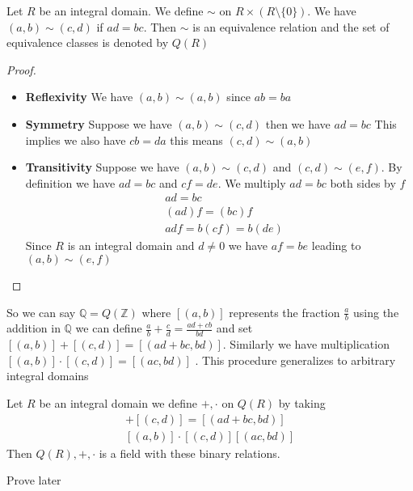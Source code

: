 \documentclass[16pt,a4paper]{article}
\theoremstyle{definition}
\newcommand{\Z}{\mathbb{Z}}
\begin{document}
\begin{prop}{}{}
Let $R$ be an integral domain. We define $\sim$ on $R\times (R\setminus \{0\})$. We have $(a,b) \sim (c,d)$ if $ad = bc$. Then $\sim$ is an equivalence relation and the set of equivalence classes is denoted by $Q(R)$
\end{prop}
\begin{proof}
$\quad$
\begin{itemize}
\item \textbf{Reflexivity} We have $(a,b) \sim (a,b)$ since $ab = ba$
\item \textbf{Symmetry} Suppose we have $(a,b)\sim (c,d)$ then we have $ad = bc$ This implies we also have $cb=da$ this means  $(c,d)\sim (a,b)$
\item \textbf{Transitivity} Suppose we have $(a,b)\sim (c,d)$ and $(c,d)\sim (e,f)$. By definition we have $ad = bc$ and $cf = de$. We multiply $ad = bc$ both sides by $f$
\begin{align*}
&ad = bc \\
&(ad)f = (bc)f \\
& adf = b(cf) = b(de)
\end{align*} 
Since $R$ is an integral domain and $d\neq 0$ we have $af = be$ leading to $(a,b) \sim (e,f)$
\end{itemize}
\end{proof}
So we can say $\mathbb{Q} = Q(\Z)$ where $[(a,b)]$ represents the fraction $\frac a b$ using the addition in $\mathbb{Q}$ we can define $\frac{a}{b} + \frac{c}{d} = \frac{ad + cb}{bd}$ and set $[(a,b)] + [(c,d)] = [(ad + bc, bd)]$. Similarly we have multiplication $[(a,b)]\cdot [(c,d)] = [(ac, bd)]$ . This procedure generalizes to arbitrary integral domains 
\newpage
\begin{prop}{}{}
Let $R$ be an integral domain we define $+,\cdot$ on $Q(R)$ by taking 
\begin{align*}
[(a,b)] + [(c,d)] = [(ad+bc,bd)] \\
[(a,b)]\cdot [(c,d)] [(ac,bd)]
\end{align*} 
Then $Q(R),+,\cdot$ is a field with these binary relations. 
\end{prop}
{\color{red} Prove later}
\end{document}
